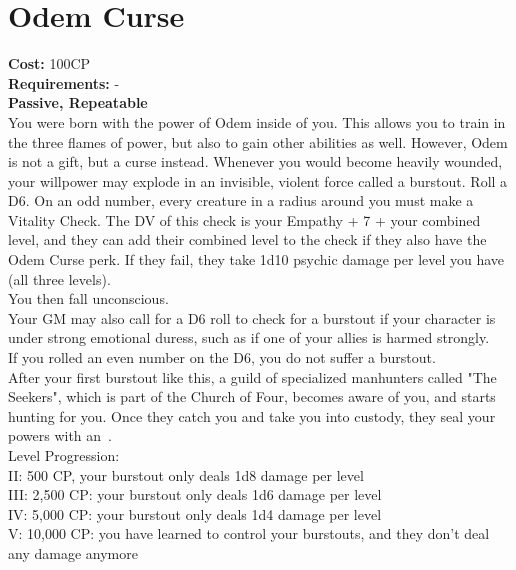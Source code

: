 \section{Odem Curse}\label{perk:odemCurse}
\textbf{Cost:} 100CP\\
\textbf{Requirements:} -\\
\textbf{Passive, Repeatable}\\
You were born with the power of Odem inside of you.
This allows you to train in the three flames of power, but also to gain other abilities as well.
However, Odem is not a gift, but a curse instead.
Whenever you would become heavily wounded, your willpower may explode in an invisible, violent force called a burstout.
Roll a D6. On an odd number, every creature in a  radius around you must make a Vitality Check.
The DV of this check is your Empathy + 7 + your combined level, and they can add their combined level to the check if they also have the Odem Curse perk.
If they fail, they take 1d10 psychic damage per level you have (all three levels).\\
You then fall unconscious.\\
Your GM may also call for a D6 roll to check for a burstout if your character is under strong emotional duress, such as if one of your allies is harmed strongly.\\
If you rolled an even number on the D6, you do not suffer a burstout.\\
After your first burstout like this, a guild of specialized manhunters called "The Seekers", which is part of the Church of Four, becomes aware of you, and starts hunting for you.
Once they catch you and take you into custody, they seal your powers with an~.
\\
Level Progression:\\
II: 500 CP, your burstout only deals 1d8 damage per level\\
III: 2,500 CP: your burstout only deals 1d6 damage per level\\
IV: 5,000 CP: your burstout only deals 1d4 damage per level\\
V: 10,000 CP: you have learned to control your burstouts, and they don't deal any damage anymore\\